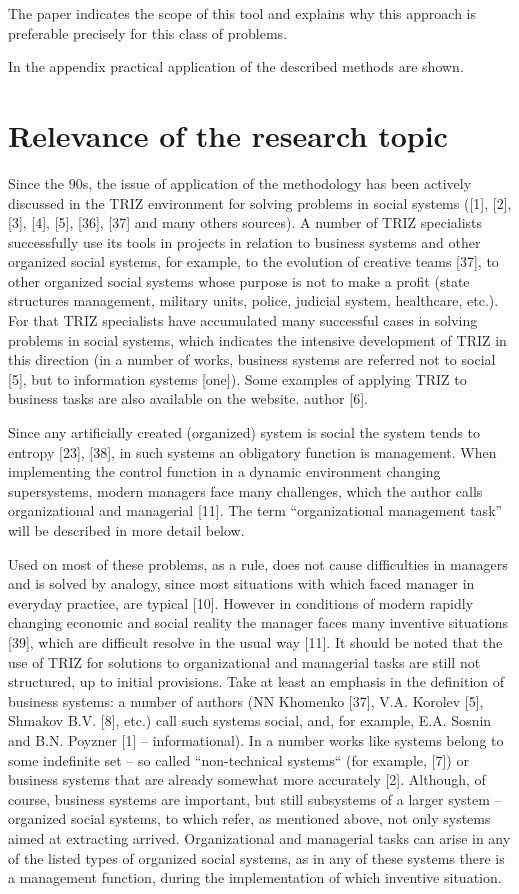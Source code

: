 The paper indicates the scope of this tool and explains why this approach is
preferable precisely for this class of problems.

In the appendix practical application of the described methods are shown.

\section{Relevance of the research topic}
Since the 90s, the issue of application of the methodology has been actively
discussed in the TRIZ environment for solving problems in social systems ([1],
[2], [3], [4], [5], [36], [37] and many others sources). A number of TRIZ
specialists successfully use its tools in projects in relation to business
systems and other organized social systems, for example, to the evolution of
creative teams [37], to other organized social systems whose purpose is not to
make a profit (state structures management, military units, police, judicial
system, healthcare, etc.). For that TRIZ specialists have accumulated many
successful cases in solving problems in social systems, which indicates the
intensive development of TRIZ in this direction (in a number of works,
business systems are referred not to social [5], but to information systems
[one]). Some examples of applying TRIZ to business tasks are also available on
the website.  author [6].

Since any artificially created (organized) system is social the system tends
to entropy [23], [38], in such systems an obligatory function is management.
When implementing the control function in a dynamic environment changing
supersystems, modern managers face many challenges, which the author calls
organizational and managerial [11]. The term “organizational management task”
will be described in more detail below.

Used on most of these problems, as a rule, does not cause difficulties in
managers and is solved by analogy, since most situations with which faced
manager in everyday practice, are typical [10]. However in conditions of
modern rapidly changing economic and social reality the manager faces many
inventive situations [39], which are difficult resolve in the usual way [11].
It should be noted that the use of TRIZ for solutions to organizational and
managerial tasks are still not structured, up to initial provisions. Take at
least an emphasis in the definition of business systems: a number of authors
(NN Khomenko [37], V.A. Korolev [5], Shmakov B.V. [8], etc.) call such systems
social, and, for example, E.A. Sosnin and B.N. Poyzner [1] -- informational).
In a number works like systems belong to some indefinite set -- so called
“non-technical systems“ (for example, [7]) or business systems that are
already somewhat more accurately [2]. Although, of course, business systems
are important, but still subsystems of a larger system -- organized social
systems, to which refer, as mentioned above, not only systems aimed at
extracting arrived. Organizational and managerial tasks can arise in any of
the listed types of organized social systems, as in any of these systems there
is a management function, during the implementation of which inventive
situation.

